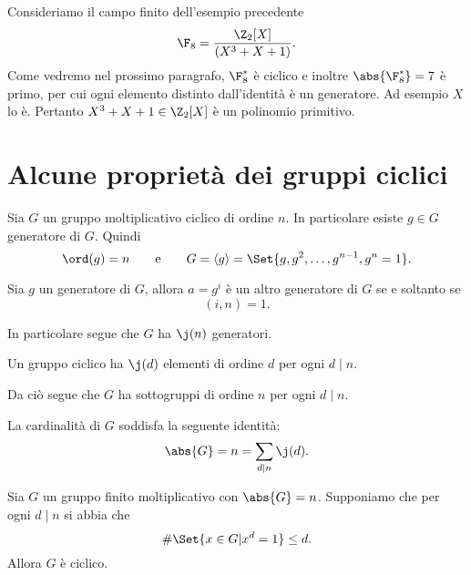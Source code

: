 	\begin{ese}
	Consideriamo il campo finito dell'esempio precedente
		\[
		\F_8 = \frac{\Z_2[X]}{(X^3+X+1)}.
		\]
	Come vedremo nel prossimo paragrafo, \(\F_8^*\) è ciclico e inoltre \(\abs{\F_8^*}=7\) è primo, per cui ogni elemento distinto dall'identità è un generatore. Ad esempio \(X\) lo è.
	Pertanto \(X^3+X+1 \in \Z_2[X]\) è un polinomio primitivo.
	\end{ese}

\section{Alcune proprietà dei gruppi ciclici}

	Sia \(G\) un gruppo moltiplicativo ciclico di ordine \(n\). In particolare esiste \(g\in G\) generatore di \(G\). Quindi
		\[
		\ord(g) = n \qquad\text{e}\qquad G=\langle g \rangle = \Set{g,g^2,\ldots,g^{n-1},g^n=1}.
		\]

	\begin{pr}
	Sia \(g\) un generatore di \(G\), allora \(a=g^i\) è un altro generatore di \(G\) se e soltanto se
		\[
		(i,n) = 1.
		\]
	\end{pr}

	\begin{oss}
	In particolare segue che \(G\) ha \(\j(n)\) generatori.
	\end{oss}

	\begin{pr}
	Un gruppo ciclico ha \(\j(d)\) elementi di ordine \(d\) per ogni \(d\mid n\).
	\end{pr}

	\begin{oss}
	Da ciò segue che \(G\) ha sottogruppi di ordine \(n\) per ogni \(d\mid n\).
	\end{oss}

	\begin{pr}
	La cardinalità di \(G\) soddisfa la seguente identità:
		\[
		\abs{G} = n = \sum_{d\mid n} \j(d).
		\]
	\end{pr}

	\begin{lem}
	Sia \(G\) un gruppo finito moltiplicativo con \(\abs{G}=n\). Supponiamo che per ogni \(d\mid n\) si abbia che
		\[
		\#\Set{x\in G | x^d = 1} \le d.
		\]
	Allora \(G\) è ciclico.
	\end{lem}

